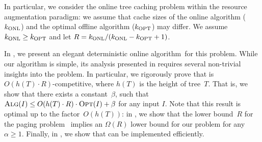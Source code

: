 In particular, we consider the online tree caching problem within the resource
augmentation paradigm: we assume that cache sizes of the online algorithm
($k_\textnormal{ONL}$)  and the optimal offline algorithm ($k_\textnormal{OPT}$) may differ. We assume
$k_\textnormal{ONL} \geq k_\textnormal{OPT}$ and let $R = k_\textnormal{ONL}/(k_\textnormal{ONL}-k_\textnormal{OPT}+1)$.

In , we present an elegant deterministic online
algorithm~\ALG for this problem. While our algorithm is simple, its analysis
presented in  requires several non-trivial
insights into the problem. In particular, we rigorously prove that \ALG is
$O(h(T) \cdot R)$-competitive, where $h(T)$ is the height of tree~$T$. That
is, we show that there exists a constant~$\beta$, such that $\textsc{Alg}(I) \leq
O(h(T) \cdot R) \cdot \textsc{Opt}(I) + \beta$ for any input $I$. Note that this
result is optimal up to the factor~$O(h(T))$: in
, we show that the lower
bound~$R$ for the paging problem~\cite{competitive-analysis} implies an
$\Omega(R)$ lower bound for our problem for any $\alpha \geq 1$. Finally, in
, we show that \ALG can be
implemented efficiently.


